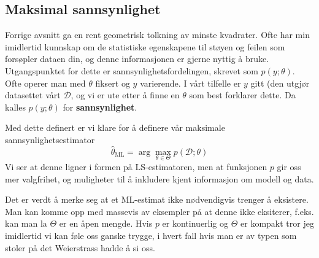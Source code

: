 \subsection{Maksimal sannsynlighet}
Forrige avsnitt ga en rent geometrisk tolkning av minste kvadrater. Ofte har min imidlertid kunnskap om de statistiske egenskapene til støyen og feilen som forsøpler dataen din, og denne informasjonen er gjerne nyttig å bruke. Utgangspunktet for dette er sannsynlighetsfordelingen, skrevet som $p(y ; \theta)$. Ofte operer man med $\theta$ fiksert og $y$ varierende. I vårt tilfelle er $y$ gitt (den utgjør datasettet vårt $\mathcal{D}$, og vi er ute etter å finne en $\theta$ som best forklarer dette. Da kalles $p(y ; \theta)$ for \textbf{sannsynlighet}.

Med dette definert er vi klare for å definere vår maksimale sannsynlighetsestimator
\begin{equation}
\widehat{\theta}_{\mathrm{ML}}=\arg \max _{\theta \in \Theta} p(\mathcal{D} ; \theta)
\end{equation}
Vi ser at denne ligner i formen på LS-estimatoren, men at funksjonen $p$ gir oss mer valgfrihet, og muligheter til å inkludere kjent informasjon om modell og data.

Det er verdt å merke seg at et ML-estimat ikke nødvendigvis trenger å eksistere. Man kan komme opp med massevis av eksempler på at denne ikke eksiterer, f.eks. kan man la $\Theta$ er en åpen mengde. Hvis $p$ er kontinuerlig og $\Theta$ er kompakt tror jeg imidlertid vi kan føle oss ganske trygge, i hvert fall hvis man er av typen som stoler på det Weierstrass hadde å si oss.

